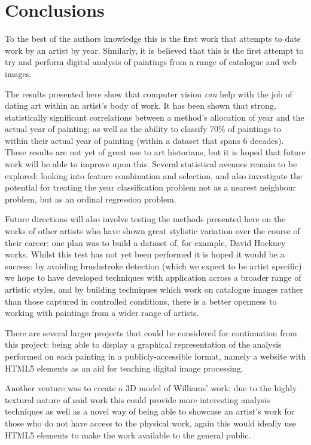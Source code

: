 \chapter{Conclusions}


To the best of the authors knowledge this is the first work that attempts to date work by an artist by 
year. Similarly, it is believed that this is the first attempt to try and perform digital analysis
of paintings from a range of catalogue and web images.

The results presented here show that computer vision \emph{can} help with the job of dating art 
within an artist's body of work. It has been shown that strong, statistically significant 
correlations between a method's allocation of year and the actual year of painting; as well as the
ability to classify 70\% of paintings to within their actual year of painting (within a dataset 
that spans 6 decades). These results are not yet of great use to art historians, but it is hoped 
that future work will be able to improve upon this. Several statistical avenues remain to be 
explored: looking into feature combination and selection, and also investigate the potential for 
treating the year classification problem not as a nearest neighbour problem, but as an ordinal 
regression problem. 

Future directions will also involve testing the methods presented here on the works of other 
artists who have shown great stylistic variation over the course of their career: one plan was to 
build a dataset of, for example, David Hockney works.  Whilst this test has not yet been performed
it is hoped it would be a success: by avoiding brushstroke detection (which we expect to be artist
specific) we hope to have developed techniques with application across a broader range of artistic
styles, and by building techniques which work on catalogue images rather than those captured in 
controlled conditions, there is a better openness to working with paintings from a wider range of 
artists.


There are several larger projects that could be considered for continuation from this project: 
being able to display a graphical representation of the analysis performed on each painting in a
publicly-accessible format, namely a website with HTML5 elements as an aid for teaching digital 
image processing.

Another venture was to create a 3D model of Williams' work; due to the highly textural nature of
said work this could provide more interesting analysis techniques as well as a novel way of being
able to showcase an artist's work for those who do not have access to the physical work, again
this would ideally use HTML5 elements to make the work available to the general public.

